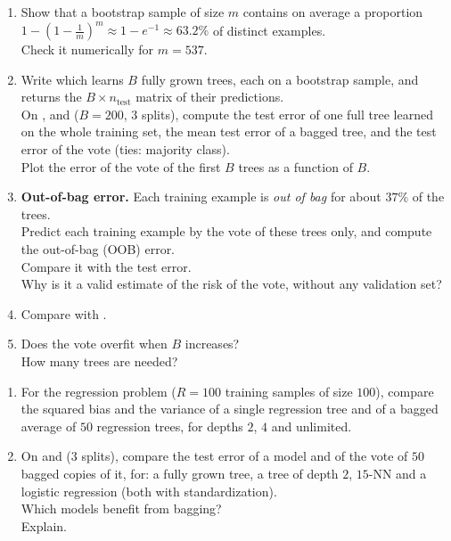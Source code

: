 \documentclass[a4paper,11pt]{article}
\begin{document}
\begin{enumerate}
\item Show that a bootstrap sample of size $m$ contains on average a proportion $1-(1-\frac1m)^m\approx1-e^{-1}\approx63.2\%$
      of distinct examples.\\
      Check it numerically for $m=537$.
\item Write  which learns $B$ fully grown trees, each on a bootstrap sample, and
      returns the $B\times n_{\text{test}}$ matrix of their predictions.\\
      On ,  and 
      ($B=200$, $3$ splits), compute the test error of one full tree learned on the whole training set, the mean test error
      of a bagged tree, and the test error of the vote (ties: majority class).\\
      Plot the error of the vote of the first $B$
      trees as a function of $B$.
\item \textbf{Out-of-bag error.} Each training example is \emph{out of bag} for about $37\%$ of the trees.\\
      Predict each
      training example by the vote of these trees only, and compute the out-of-bag (OOB) error.\\
      Compare it with the test
      error.\\
      Why is it a valid estimate of the risk of the vote, without any validation set?
\item Compare with .
\item Does the vote overfit when $B$ increases?\\
      How many trees are needed?
\end{enumerate}

\label{p2:what}

\begin{enumerate}
\item For the regression problem ($R=100$ training samples of size $100$), compare the squared bias and the variance of a
      single regression tree and of a bagged average of $50$ regression trees, for depths $2$, $4$ and unlimited.
\item On  and  ($3$ splits), compare the test error of a model and of the vote of $50$ bagged
      copies of it, for: a fully grown tree, a tree of depth $2$, $15$-NN and a logistic regression (both with
      standardization).\\
      Which models benefit from bagging?\\
      Explain.
\end{enumerate}
\end{document}
